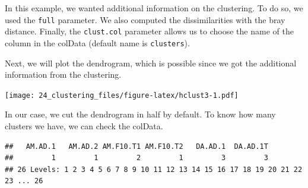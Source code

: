 \documentclass[
]{book}
\newenvironment{Shaded}{\begin{snugshade}}{\end{snugshade}}
\newcommand{\CommentTok}[1]{\textcolor[rgb]{0.56,0.35,0.01}{\textit{#1}}}
\newcommand{\ConstantTok}[1]{\textcolor[rgb]{0.00,0.00,0.00}{#1}}
\newcommand{\FunctionTok}[1]{\textcolor[rgb]{0.00,0.00,0.00}{#1}}
\newcommand{\NormalTok}[1]{#1}
\newcommand{\OtherTok}[1]{\textcolor[rgb]{0.56,0.35,0.01}{#1}}
\newcommand{\SpecialCharTok}[1]{\textcolor[rgb]{0.00,0.00,0.00}{#1}}
\newcommand{\StringTok}[1]{\textcolor[rgb]{0.31,0.60,0.02}{#1}}
\begin{document}
In this example, we wanted additional information on the clustering. To do so,
we used the \texttt{full} parameter. We also computed the dissimilarities with the
bray distance. Finally, the \texttt{clust.col} parameter allows us to choose the name
of the column in the colData (default name is \texttt{clusters}).

Next, we will plot the dendrogram, which is possible since we got the
additional information from the clustering.

\begin{Shaded}
\end{Shaded}

\texttt{[image: 24\_clustering\_files/figure-latex/hclust3-1.pdf]}

In our case, we cut the dendrogram in half by default. To know how many clusters
we have, we can check the colData.

\begin{Shaded}
\end{Shaded}

\begin{verbatim}
##   AM.AD.1   AM.AD.2 AM.F10.T1 AM.F10.T2   DA.AD.1  DA.AD.1T 
##         1         1         2         1         3         3 
## 26 Levels: 1 2 3 4 5 6 7 8 9 10 11 12 13 14 15 16 17 18 19 20 21 22 23 ... 26
\end{verbatim}
\end{document}
